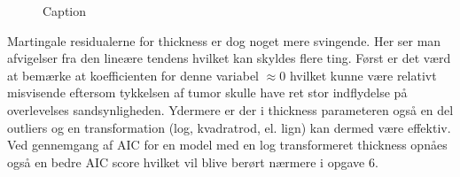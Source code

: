 \newpage
\begin{figure}[h]
    \centering
    \hfill
  \hfill
    \caption{Caption}
    \label{fig:enter-label}
\end{figure}

\noindent Martingale residualerne for thickness er dog noget mere svingende. Her ser man afvigelser fra den lineære tendens hvilket kan skyldes flere ting. Først er det værd at bemærke at koefficienten for denne variabel $\approx 0$ hvilket kunne være relativt misvisende eftersom tykkelsen af tumor skulle have ret stor indflydelse på overlevelses sandsynligheden. Ydermere er der i thickness parameteren også en del outliers og en transformation (log, kvadratrod, el. lign) kan dermed være effektiv. Ved gennemgang af AIC for en model med en log transformeret thickness opnåes også en bedre AIC score hvilket vil blive berørt nærmere i opgave 6.

